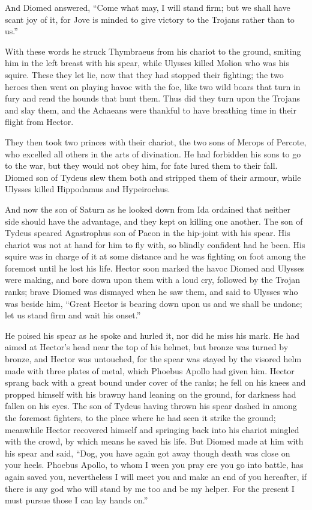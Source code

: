 And Diomed answered, “Come what may, I will stand firm; but we shall have
scant joy of it, for Jove is minded to give victory to the Trojans rather
than to us.”

With these words he struck Thymbraeus from his chariot to the ground,
smiting him in the left breast with his spear, while Ulysses killed Molion
who was his squire. These they let lie, now that they had stopped their
fighting; the two heroes then went on playing havoc with the foe, like two
wild boars that turn in fury and rend the hounds that hunt them. Thus did
they turn upon the Trojans and slay them, and the Achaeans were thankful
to have breathing time in their flight from Hector.

They then took two princes with their chariot, the two sons of Merops of
Percote, who excelled all others in the arts of divination. He had
forbidden his sons to go to the war, but they would not obey him, for fate
lured them to their fall. Diomed son of Tydeus slew them both and stripped
them of their armour, while Ulysses killed Hippodamus and Hypeirochus.

And now the son of Saturn as he looked down from Ida ordained that neither
side should have the advantage, and they kept on killing one another. The
son of Tydeus speared Agastrophus son of Paeon in the hip-joint with his
spear. His chariot was not at hand for him to fly with, so blindly
confident had he been. His squire was in charge of it at some distance and
he was fighting on foot among the foremost until he lost his life. Hector
soon marked the havoc Diomed and Ulysses were making, and bore down upon
them with a loud cry, followed by the Trojan ranks; brave Diomed was
dismayed when he saw them, and said to Ulysses who was beside him, “Great
Hector is bearing down upon us and we shall be undone; let us stand firm
and wait his onset.”

He poised his spear as he spoke and hurled it, nor did he miss his mark.
He had aimed at Hector’s head near the top of his helmet, but bronze was
turned by bronze, and Hector was untouched, for the spear was stayed by
the visored helm made with three plates of metal, which Phoebus Apollo had
given him. Hector sprang back with a great bound under cover of the ranks;
he fell on his knees and propped himself with his brawny hand leaning on
the ground, for darkness had fallen on his eyes. The son of Tydeus having
thrown his spear dashed in among the foremost fighters, to the place where
he had seen it strike the ground; meanwhile Hector recovered himself and
springing back into his chariot mingled with the crowd, by which means he
saved his life. But Diomed made at him with his spear and said, “Dog, you
have again got away though death was close on your heels. Phoebus Apollo,
to whom I ween you pray ere you go into battle, has again saved you,
nevertheless I will meet you and make an end of you hereafter, if there is
any god who will stand by me too and be my helper. For the present I must
pursue those I can lay hands on.”

